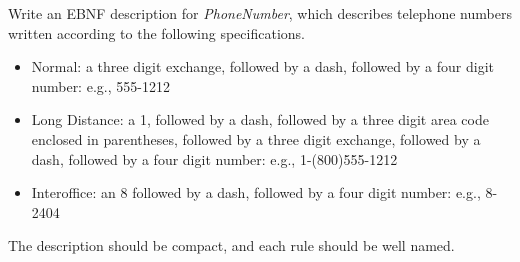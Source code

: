 \documentclass{exam}
\theoremstyle{definition}
\theoremstyle{definition}
\begin{document}
\begin{questions}
Write an EBNF description for {\em PhoneNumber}, which describes telephone numbers written according to the following specifications.

\begin{itemize}
	\item Normal: a three digit exchange, followed by a dash, followed by a four digit number: e.g., 555-1212
	
	\item Long Distance: a 1, followed by a dash, followed by a three digit area code enclosed in parentheses, followed by a three digit exchange, followed by a dash, followed by a four digit number: e.g., 1-(800)555-1212
	
	\item Interoffice: an 8 followed by a dash, followed by a four digit number: e.g., 8-2404
\end{itemize}
The description should be compact, and each rule should be well named.


\end{questions}
\end{document}
